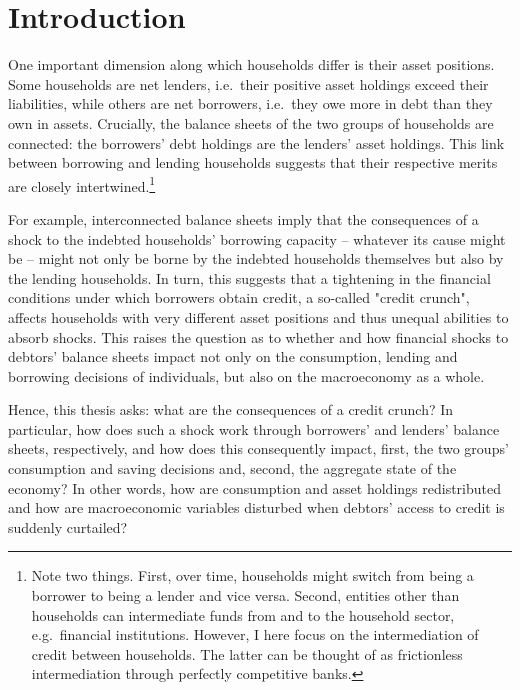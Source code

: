 \documentclass[12pt]{article} %
\numberwithin{equation}{section} %
\begin{document}
\thispagestyle{plain}
\section{Introduction}
\label{sec:introduction}

One important dimension along which households differ is their asset positions. Some households are net lenders, i.e.~their positive asset holdings exceed their liabilities, while others are net borrowers, i.e.~they owe more in debt than they own in assets. Crucially, the balance sheets of the two groups of households are connected: the borrowers' debt holdings are the lenders' asset holdings. This link between borrowing and lending households suggests that their respective merits are closely intertwined.\footnote{Note two things. First, over time, households might switch from being a borrower to being a lender and vice versa. Second, entities other than households can intermediate funds from and to the household sector, e.g.~financial institutions. However, I here focus on the intermediation of credit between households. The latter can be thought of as frictionless intermediation through perfectly competitive banks.} 

For example, interconnected balance sheets imply that the consequences of a shock to the indebted households' borrowing capacity -- whatever its cause might be -- might not only be borne by the indebted households themselves but also by the lending households. In turn, this suggests that a tightening in the financial conditions under which borrowers obtain credit, a so-called "credit crunch", affects households with very different asset positions and thus unequal abilities to absorb shocks. This raises the question as to whether and how financial shocks to debtors' balance sheets impact not only on the consumption, lending and borrowing decisions of individuals, but also on the macroeconomy as a whole. 

Hence, this thesis asks: what are the consequences of a credit crunch? In particular, how does such a shock work through borrowers' and lenders' balance sheets, respectively, and how does this consequently impact, first, the two groups' consumption and saving decisions and, second, the aggregate state of the economy? In other words, how are consumption and asset holdings redistributed and how are macroeconomic variables disturbed when debtors' access to credit is suddenly curtailed?
\end{document}
